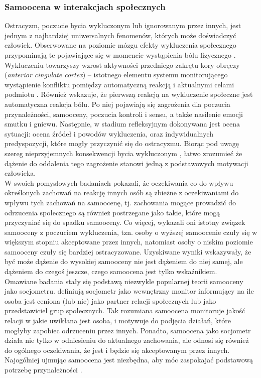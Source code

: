 \documentclass[man]{apa6}
\begin{document}
\subsubsection{Samoocena w interakcjach społecznych}

Ostracyzm, poczucie bycia wykluczonym lub ignorowanym przez innych, jest jednym z najbardziej uniwersalnych fenomenów, których może doświadczyć człowiek. Obserwowane na poziomie mózgu efekty wykluczenia społecznego przypominają te pojawiające się w momencie wystąpienia bólu fizycznego \parencite{eisenberger2003does}. Wykluczeniu towarzyszy wzrost aktywności przedniego zakrętu kory obręczy (\emph{anterior cingulate cortex}) -- istotnego elementu systemu monitorującego wystąpienie konfliktu pomiędzy automatyczną reakcją i aktualnymi celami podmiotu \parencite{bush2000cognitive}. Również \textcite{williams2007ostracism} wskazuje, że pierwszą reakcją na wykluczenie społeczne jest automatyczna reakcja bólu. Po niej pojawiają się zagrożenia dla poczucia przynależności, samooceny, poczucia kontroli i sensu, a także nasilenie emocji smutku i gniewu. Następnie, w stadium refleksyjnym dokonywana jest ocena sytuacji: ocena źródeł i powodów wykluczenia, oraz indywidualnych predyspozycji, które mogły przyczynić się do ostracyzmu. Biorąc pod uwagę szereg nieprzyjemnych konsekwencji bycia wykluczonym \parencite[patrz również][]{leary1990responses}, łatwo zrozumieć że dążenie do oddalenia tego zagrożenie stanowi jedną z podstawowych motywacji człowieka.\\

W swoich pomysłowych badaniach \textcite{leary1995self} pokazali, że oczekiwania co do wpływu określonych zachowań na reakcję innych osób są zbieżne z oczekiwaniami do wpływu tych zachowań na samoocenę, tj. zachowania mogące prowadzić do odrzucenia społecznego są również postrzegane jako takie, które mogą przyczyniać się do spadku samooceny. Co więcej, wykazali oni istotny związek samooceny z poczuciem wykluczenia, tzn. osoby o wyższej samoocenie czuły się w większym stopniu akceptowane przez innych, natomiast osoby o niskim poziomie samooceny czuły się bardziej ostracyzowane. Uzyskiwane wyniki wskazywały, że być może dążenie do wysokiej samooceny nie jest dążeniem do niej samej, ale dążeniem do czegoś jeszcze, czego samoocena jest tylko wskaźnikiem.\\

Omawiane badania stały się podstawą niezwykle popularnej teorii samooceny jako socjometru. \textcite{leary2000nature} definiują socjometr jako wewnętrzny monitor informujący na ile osoba jest ceniona (lub nie) jako partner relacji społecznych lub jako przedstawiciel grup społecznych. Tak rozumiana samoocena monitoruje jakość relacji w jakie uwikłana jest osoba, i motywuje do podjęcia działań, które mogłyby zapobiec odrzuceniu przez innych. Ponadto, samoocena jako socjometr działa nie tylko w odniesieniu do aktualnego zachowania, ale odnosi się również do ogólnego oczekiwania, że jest i będzie się akceptowanym przez innych. Najogólniej ujmując samoocena jest niezbędna, aby móc zaspokajać podstawową potrzebę przynależności \parencite{baumeister1995need}.\\
\end{document}
